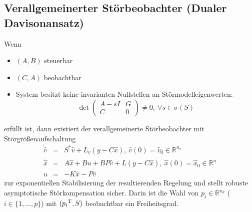 \subsection{Verallgemeinerter Störbeobachter (Dualer Davisonansatz)}
Wenn
\begin{itemize}
    \item $(A, B)$ steuerbar
    \item $(C, A)$ beobachtbar
    \item System besitzt keine invarianten Nullstellen an Störmodelleigenwerten:
        \begin{equation}
            \det \begin{pmatrix} 
                    A-sI & G \\
                    C & 0
                \end{pmatrix} \neq 0,\ \forall s \in \sigma(S)
        \end{equation}
\end{itemize}
erfüllt ist, dann existiert der verallgemeinerte Störbeobachter mit Störgrößenaufschaltung
\begin{eqnarray}
    \dot{\hat{v}} &=& S^* \hat{v} + L_v (y- C \hat{x}),\ \hat{v}(0)=\hat{v}_0 \in \mathbb{R}^{n_v} \\
    \dot{\hat{x}} &=& A \hat{x} + Bu + BP\hat{v} + L (y-C\hat{x}),\ \hat{x}(0)=\hat{x}_0 \in \mathbb{R}^n \\
    u&=& -K \hat{x} - P \hat{v}
\end{eqnarray}
zur exponentiellen Stabilisierung der resultierenden Regelung und stellt robuste
asymptotische Störkompensation sicher. Darin ist die Wahl von $p_i \in \mathbb{R}^{n_d}$
($i \in \{1, \ldots, p\}$) mit $({p_i}^\text{T}, S)$ beobachtbar ein Freiheitsgrad.


